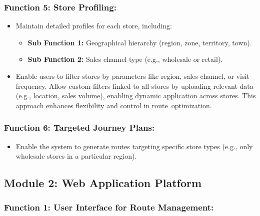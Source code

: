 
\subsubsection*{Function 5: Store Profiling: }

\begin{itemize}
    \item Maintain detailed profiles for each store, including:
    \begin{itemize}
        \item[] \textbf{Sub Function 1:} Geographical hierarchy (region, zone, territory, town).
        \item[] \textbf{Sub Function 2:} Sales channel type (e.g., wholesale or retail).
    \end{itemize}
    \item Enable users to filter stores by parameters like region, sales channel, or visit frequency. Allow custom filters linked to all stores by uploading relevant data (e.g., location, sales volume), enabling dynamic application across stores. This approach enhances flexibility and control in route optimization.
\end{itemize}

\subsubsection*{Function 6: Targeted Journey Plans:}
 
\begin{itemize}
    \item Enable the system to generate routes targeting specific store types (e.g., only wholesale stores in a particular region).
\end{itemize}

 

\subsection*{Module 2: Web Application Platform 
}

\subsubsection*{Function 1: User Interface for Route Management: 
}

